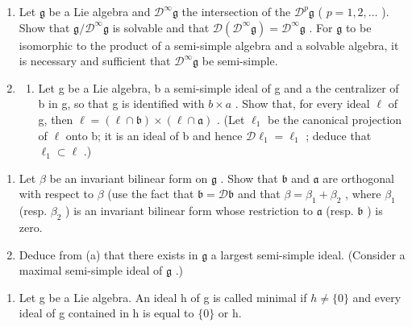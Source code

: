 \begin{enumerate}
\def\labelenumi{\arabic{enumi}.}
\setcounter{enumi}{5}
\item
  Let \(\mathfrak{g}\) be a Lie algebra and \(\mathcal{D}^{\infty}\mathfrak{g}\) the intersection of the \(\mathcal{D}^{p}\mathfrak{g}\) ( \(p = 1,2,\ldots\) ). Show that \(\mathfrak{g}/\mathcal{D}^{\infty}\mathfrak{g}\) is solvable and that \(\mathcal{D}(\mathcal{D}^{\infty}\mathfrak{g}) = \mathcal{D}^{\infty}\mathfrak{g}\) . For \(\mathfrak{g}\) to be isomorphic to the product of a semi-simple algebra and a solvable algebra, it is necessary and sufficient that \(\mathcal{D}^{\infty}\mathfrak{g}\) be semi-simple.
\item
  \begin{enumerate}
  \def\labelenumii{(\alph{enumii})}
  \tightlist
  \item
    Let g be a Lie algebra, b a semi-simple ideal of g and a the centralizer of b in g, so that g is identified with \(b \times a\) . Show that, for every ideal \(\ell\) of g, then \(\ell = (\ell \cap \mathfrak{b}) \times (\ell \cap \mathfrak{a})\) . (Let \(\ell_{1}\) be the canonical projection of \(\ell\) onto b; it is an ideal of b and hence \(\mathcal{D}\ell_{1} = \ell_{1}\) ; deduce that \(\ell_{1} \subset \ell\) .)
  \end{enumerate}
\end{enumerate}

\begin{enumerate}
\def\labelenumi{(\alph{enumi})}
\setcounter{enumi}{1}
\item
  Let \(\beta\) be an invariant bilinear form on \(\mathfrak{g}\) . Show that \(\mathfrak{b}\) and \(\mathfrak{a}\) are orthogonal with respect to \(\beta\) (use the fact that \(\mathfrak{b} = \mathcal{D}\mathfrak{b}\) and that \(\beta = \beta_{1} + \beta_{2}\) , where \(\beta_{1}\) (resp. \(\beta_{2}\) ) is an invariant bilinear form whose restriction to \(\mathfrak{a}\) (resp. \(\mathfrak{b}\) ) is zero.
\item
  Deduce from (a) that there exists in \(\mathfrak{g}\) a largest semi-simple ideal. (Consider a maximal semi-simple ideal of \(\mathfrak{g}\) .)
\end{enumerate}

\begin{enumerate}
\def\labelenumi{\arabic{enumi}.}
\setcounter{enumi}{7}
\tightlist
\item
  Let g be a Lie algebra. An ideal h of g is called minimal if \(h \neq \{0\}\) and every ideal of g contained in h is equal to \(\{0\}\) or h.
\end{enumerate}

